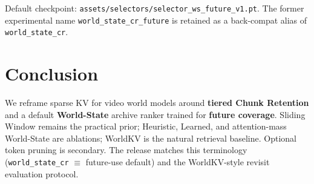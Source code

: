 \documentclass{article}
\begin{document}
Default checkpoint: \texttt{assets/selectors/selector\_ws\_future\_v1.pt}.
The former experimental name \texttt{world\_state\_cr\_future} is retained
as a back-compat alias of \texttt{world\_state\_cr}.

\section{Conclusion}
\label{sec:conclusion}

We reframe sparse KV for video world models around
\textbf{tiered Chunk Retention} and a default \textbf{World-State} archive
ranker trained for \textbf{future coverage}.  Sliding Window remains the
practical prior; Heuristic, Learned, and attention-mass World-State are
ablations; WorldKV is the natural retrieval baseline.  Optional token
pruning is secondary.  The release matches this terminology
(\texttt{world\_state\_cr} $\equiv$ future-use default) and the
WorldKV-style revisit evaluation protocol.



\end{document}
